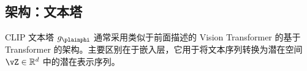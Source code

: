 \documentclass[../../book-main_zh.tex]{subfiles}
\begin{document}


\subsection{架构：文本塔}
CLIP 文本塔 \(g_{\plainphi}\) 通常采用类似于前面描述的 Vision Transformer 的基于 Transformer 的架构。主要区别在于嵌入层，它用于将文本序列转换为潜在空间 \(\vZ \in \mathbb{R}^{d}\) 中的潜在表示序列。 
\end{document}
